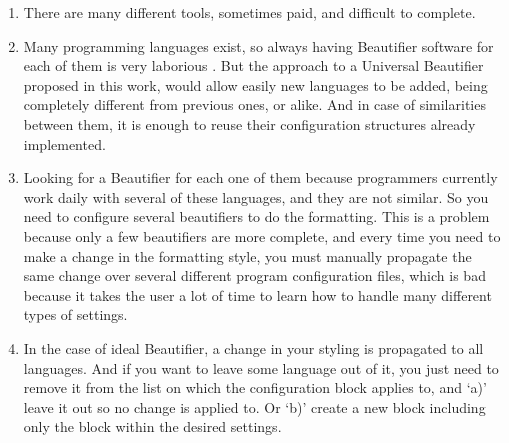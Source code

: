     \begin{enumerate}[leftmargin=*]
        \item There are many different tools, sometimes paid, and difficult to
              complete. \cite{universalCodeFormatter}

        \item Many programming languages exist, so always having Beautifier
              software for each of them is very laborious
              \cite{universalCodeFormatter}. But the approach to a Universal
              Beautifier proposed in this work, would allow easily new languages to be
              added, being completely different from previous ones, or alike. And in
              case of similarities between them, it is enough to reuse their
              configuration structures already implemented.

        \item Looking for a Beautifier for each one of them because programmers
              currently work daily with several of these languages, and they are not
              similar. So you need to configure several beautifiers to do the
              formatting. This is a problem because only a few beautifiers are more
              complete, and every time you need to make a change in the formatting
              style, you must manually propagate the same change over several
              different program configuration files, which is bad because it takes the
              user a lot of time to learn how to handle many different types of
              settings. \cite{Schweitzer}

        \item In the case of ideal Beautifier, a change in your styling is
              propagated to all languages. And if you want to leave some language out
              of it, you just need to remove it from the list on which the
              configuration block applies to, and `a)' leave it out so no change is
              applied to. Or `b)' create a new block including only the block within
              the desired settings.

    \end{enumerate}



%
%
%

